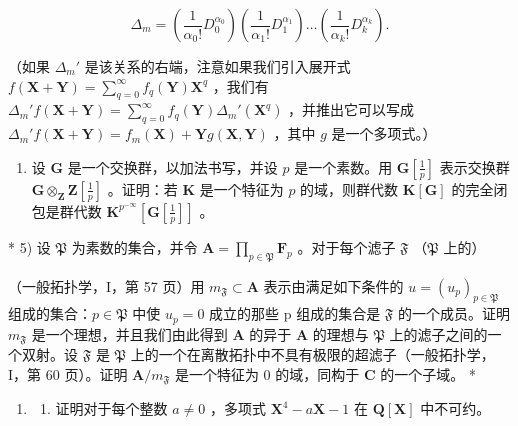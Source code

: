 \[
\Delta_ {m} = \left(\frac {1}{\alpha_ {0} !} D _ {0} ^ {\alpha_ {0}}\right) \left(\frac {1}{\alpha_ {1} !} D _ {1} ^ {\alpha_ {1}}\right) \dots \left(\frac {1}{\alpha_ {k} !} D _ {k} ^ {\alpha_ {k}}\right).
\]

（如果 \(\Delta_m'\) 是该关系的右端，注意如果我们引入展开式 \(f(\mathbf{X} + \mathbf{Y}) = \sum_{q=0}^{\infty} f_q(\mathbf{Y}) \mathbf{X}^q\) ，我们有 \(\Delta_m' f(\mathbf{X} + \mathbf{Y}) = \sum_{q=0}^{\infty} f_q(\mathbf{Y}) \Delta_m'(\mathbf{X}^q)\) ，并推出它可以写成 \(\Delta_m' f(\mathbf{X} + \mathbf{Y}) = f_m(\mathbf{X}) + \mathbf{Y} g(\mathbf{X}, \mathbf{Y})\) ，其中 \(g\) 是一个多项式。）

\begin{enumerate}
\def\labelenumi{\arabic{enumi})}
\setcounter{enumi}{3}
\tightlist
\item
  设 \(\mathbf{G}\) 是一个交换群，以加法书写，并设 \(p\) 是一个素数。用 \(\mathbf{G}\left[\frac{1}{p}\right]\) 表示交换群 \(\mathbf{G} \otimes_{\mathbf{Z}} \mathbf{Z}\left[\frac{1}{p}\right]\) 。证明：若 \(\mathbf{K}\) 是一个特征为 \(p\) 的域，则群代数 \(\mathbf{K}[\mathbf{G}]\) 的完全闭包是群代数 \(\mathbf{K}^{p^{-\infty}}\left[\mathbf{G}\left[\frac{1}{p}\right]\right]\) 。
\end{enumerate}

* 5) 设 \(\mathfrak{P}\) 为素数的集合，并令 \(\mathbf{A} = \prod_{p\in \mathfrak{P}}\mathbf{F}_p\) 。对于每个滤子 \(\mathfrak{F}\) （\(\mathfrak{P}\) 上的）

（一般拓扑学，I，第 57 页）用 \(m_{\mathfrak{F}} \subset \mathbf{A}\) 表示由满足如下条件的 \(u = (u_p)_{p \in \mathfrak{P}}\) 组成的集合：\(p \in \mathfrak{P}\) 中使 \(u_p = 0\) 成立的那些 p 组成的集合是 \(\mathfrak{F}\) 的一个成员。证明 \(m_{\mathfrak{F}}\) 是一个理想，并且我们由此得到 \(\mathbf{A}\) 的异于 \(\mathbf{A}\) 的理想与 \(\mathfrak{P}\) 上的滤子之间的一个双射。设 \(\mathfrak{F}\) 是 \(\mathfrak{P}\) 上的一个在离散拓扑中不具有极限的超滤子（一般拓扑学，I，第 60 页）。证明 \(\mathbf{A}/m_{\mathfrak{F}}\) 是一个特征为 0 的域，同构于 \(\mathbf{C}\) 的一个子域。 *

\BourbakiExerciseGroup

\begin{enumerate}
\def\labelenumi{\arabic{enumi})}
\tightlist
\item
  \begin{enumerate}
  \def\labelenumii{\alph{enumii})}
  \tightlist
  \item
    证明对于每个整数 \(a \neq 0\) ，多项式 \(\mathbf{X}^4 - a\mathbf{X} - 1\) 在 \(\mathbf{Q}[\mathbf{X}]\) 中不可约。
  \end{enumerate}
\end{enumerate}

